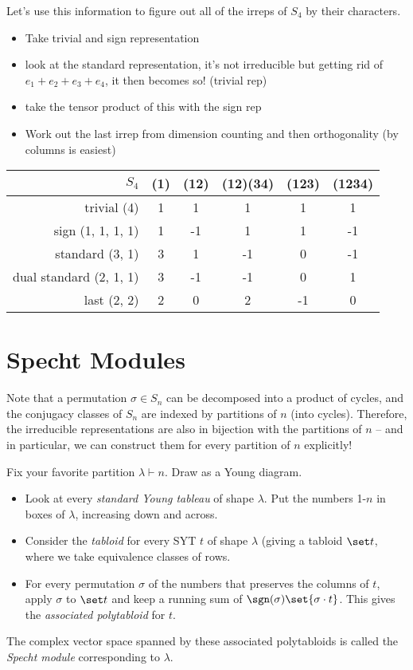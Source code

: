 \documentclass[12pt]{article}
\begin{document}
Let's use this information to figure out all of the irreps of $S_4$ by their
characters.
\begin{itemize}
  \item Take trivial and sign representation 
  \item look at the standard representation, it's not irreducible but getting
    rid of $e_1 + e_2 + e_3 + e_4$, it then becomes so! (trivial rep)
  \item take the tensor product of this with the sign rep
  \item Work out the last irrep from dimension counting and then orthogonality 
    (by columns is easiest) 
\end{itemize}

\begin{center}
  \begin{tabular}{r|ccccc}
    $S_4$ & (1) & (12) & (12)(34) & (123) & (1234) \\ \hline
    trivial (4) & 1 & 1 & 1 & 1 & 1 \\ 
    sign (1, 1, 1, 1) & 1 & -1 & 1 & 1 & -1 \\ 
    standard (3, 1) & 3 & 1 & -1 & 0 & -1 \\ 
    dual standard (2, 1, 1) & 3 & -1 & -1 & 0 & 1 \\ 
    last (2, 2) & 2 & 0 & 2 & -1 & 0
  \end{tabular}
\end{center}

\section{Specht Modules} 
Note that a permutation $\sigma \in S_n$ can be decomposed into a product of
cycles, and the conjugacy classes of $S_n$ are indexed by partitions of $n$
(into cycles). Therefore, the irreducible representations are also in bijection
with the partitions of $n$ -- and in particular, we can construct them for every
partition of $n$ explicitly!

Fix your favorite partition $\lambda \vdash n$. Draw as a Young diagram.  
\begin{itemize}
  \item Look at every \emph{standard Young tableau} of shape $\lambda$. Put the
    numbers 1-$n$ in boxes of $\lambda$, increasing down and across. 
  \item Consider the \emph{tabloid} for every SYT $t$ of shape $\lambda$ (giving
    a tabloid $\set t$, where we take equivalence classes of rows. 
  \item For every permutation $\sigma$ of the numbers that preserves the columns
    of $t$, apply $\sigma$ to $\set t$ and keep a running sum of
    $\sgn(\sigma)\set{\sigma \cdot t}$. This gives the \emph{associated
    polytabloid} for $t$.  
\end{itemize}
The complex vector space spanned by these associated polytabloids is called the
\emph{Specht module} corresponding to $\lambda$. 
\end{document}
